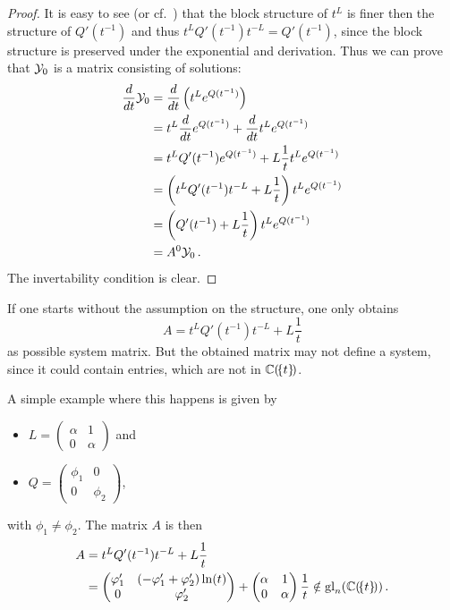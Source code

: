 \begin{proof}
  It is easy to see (or cf.~\cite[Appendix C.1]{Balser2000Formal}) that the
  block structure of $t^L$ is finer then the structure of $Q'(t^{-1})$ and thus
  $t^LQ'(t^{-1})t^{-L}=Q'(t^{-1})$, since the block structure is preserved under
  the exponential and derivation.
  Thus we can prove that $\mathcal{Y}_0$ is a matrix consisting of solutions:
  \begin{align*}
    \frac{d}{dt}\mathcal{Y}_0
    &=\frac{d}{dt}\left(t^Le^{Q(t^{-1})}\right)
  \\&= t^L\frac{d}{dt}e^{Q(t^{-1})} + \frac{d}{dt}t^Le^{Q(t^{-1})}
  \\&= t^LQ'(t^{-1})e^{Q(t^{-1})} + L\frac{1}{t}t^Le^{Q(t^{-1})}
  \\&=\left(t^LQ'(t^{-1})t^{-L}+L\frac{1}{t}\right)t^Le^{Q(t^{-1})}
  \\&=\left(Q'(t^{-1})+L\frac{1}{t}\right)t^Le^{Q(t^{-1})}
  \\&=A^0\mathcal{Y}_0 \,.
  \end{align*}
  The invertability condition is clear.
\end{proof}
\begin{rem}
  If one starts without the assumption on the structure, one only obtains
  \[
    A=t^LQ'(t^{-1})t^{-L}+L\frac{1}{t}
  \]
  as possible system matrix. But the obtained matrix may not define a system,
  since it could contain entries, which are not in $\mathbb{C}(\!\{t\}\!)$.

  A simple example where this happens is given by
  \begin{itemize}
  \item $L=\begin{pmatrix} \alpha & 1 \\ 0 & \alpha \end{pmatrix}$ and
  \item $Q=\begin{pmatrix} \phi_1 & 0 \\ 0 & \phi_2 \end{pmatrix}$,
  \end{itemize}
  with $\phi_1\neq\phi_2$.
  The matrix $A$ is then
  \begin{align*}
    A  &=t^LQ'(t^{-1})t^{-L}+L\frac{1}{t}
    \\ &=
    \begin{pmatrix}
      \varphi_1' & (-\varphi_1'+\varphi_2')\ln(t)
      \\0     & \varphi_2'
    \end{pmatrix}
    +
    \begin{pmatrix}
        \alpha & 1
        \\ 0   & \alpha
    \end{pmatrix} \frac{1}{t}
    \notin\operatorname{gl}_n(\mathbb{C}(\!\{t\}\!))
    \,.
  \end{align*}
\end{rem}
